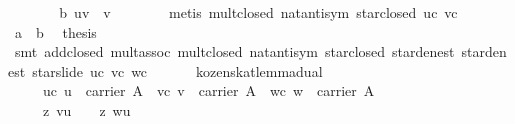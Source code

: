 \begin{isabellebody}
\ \ \ \ \isamarkupfalse%
\ \isamarkupfalse%
\ b{}\ {}uv\ {}\ v{}\isanewline
\ \ \ \ \ \ \isamarkupfalse%
\ {}metis\ mult{}closed\ nat{}antisym\ star{}closed\ uc\ vc{}\isanewline
\isanewline
\ \ \ \ \isamarkupfalse%
\ a\ \ b\ \isamarkupfalse%
\ {}thesis\isanewline
\ \ \ \ \ \ \isamarkupfalse%
\ {}smt\ add{}closed\ mult{}assoc\ mult{}closed\ nat{}antisym\ star{}closed\ star{}denest{}{}\ star{}denest{}{}\ star{}slide\ uc\ vc\ wc{}\isanewline
\ \ \isamarkupfalse%
%
\endisatagproof
{\isafoldproof}%
%
\isadelimproof
\isanewline
%
\endisadelimproof
\isanewline
\ \ \isamarkupfalse%
\ kozen{}skat{}lemma{}dual{}\isanewline
\ \ \ \ \ uc{}\ {}u\ {}\ carrier\ A{}\ \ vc{}\ {}v\ {}\ carrier\ A{}\ \ wc{}\ {}w\ {}\ carrier\ A{}\isanewline
\ \ \ \ \ z{}{}\ {}v{}u\ {}\ {}{}\ \ z{}{}\ {}w{}u\ {}\ {}{}\isanewline

\end{isabellebody}
